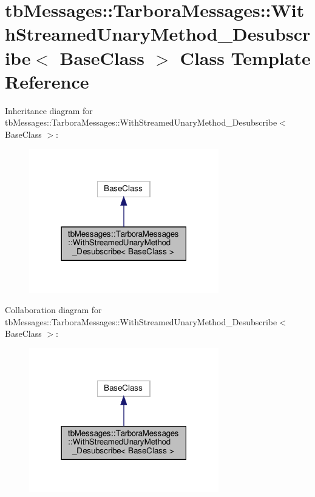 \hypertarget{classtbMessages_1_1TarboraMessages_1_1WithStreamedUnaryMethod__Desubscribe}{}\section{tb\+Messages\+:\+:Tarbora\+Messages\+:\+:With\+Streamed\+Unary\+Method\+\_\+\+Desubscribe$<$ Base\+Class $>$ Class Template Reference}
\label{classtbMessages_1_1TarboraMessages_1_1WithStreamedUnaryMethod__Desubscribe}


Inheritance diagram for tb\+Messages\+:\+:Tarbora\+Messages\+:\+:With\+Streamed\+Unary\+Method\+\_\+\+Desubscribe$<$ Base\+Class $>$\+:
\nopagebreak
\begin{figure}[H]
\begin{center}
\leavevmode
\includegraphics[width=234pt]{classtbMessages_1_1TarboraMessages_1_1WithStreamedUnaryMethod__Desubscribe__inherit__graph}
\end{center}
\end{figure}


Collaboration diagram for tb\+Messages\+:\+:Tarbora\+Messages\+:\+:With\+Streamed\+Unary\+Method\+\_\+\+Desubscribe$<$ Base\+Class $>$\+:
\nopagebreak
\begin{figure}[H]
\begin{center}
\leavevmode
\includegraphics[width=234pt]{classtbMessages_1_1TarboraMessages_1_1WithStreamedUnaryMethod__Desubscribe__coll__graph}
\end{center}
\end{figure}

